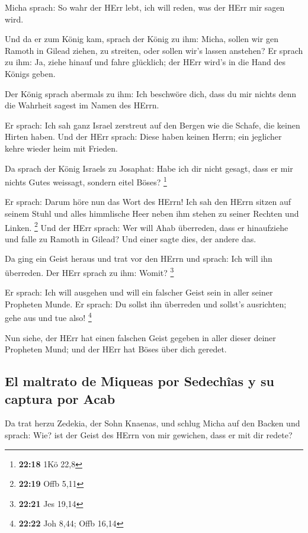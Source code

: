  Micha sprach: So wahr der HErr lebt, ich will reden, was
der HErr mir sagen wird.

 Und da er zum König kam, sprach der König zu ihm: Micha,
sollen wir gen Ramoth in Gilead ziehen, zu streiten, oder sollen wir's
lassen anstehen? Er sprach zu ihm: Ja, ziehe hinauf und fahre glücklich;
der HErr wird's in die Hand des Königs geben.

 Der König sprach abermals zu ihm: Ich beschwöre dich,
dass du mir nichts denn die Wahrheit sagest im Namen des HErrn.

 Er sprach: Ich sah ganz Israel zerstreut auf den Bergen
wie die Schafe, die keinen Hirten haben. Und der HErr sprach: Diese
haben keinen Herrn; ein jeglicher kehre wieder heim mit Frieden.

 Da sprach der König Israels zu Josaphat: Habe ich dir
nicht gesagt, dass er mir nichts Gutes weissagt, sondern eitel Böses?
\footnote{\textbf{22:18} 1Kö 22,8}

 Er sprach: Darum höre nun das Wort des HErrn! Ich sah
den HErrn sitzen auf seinem Stuhl und alles himmlische Heer neben ihm
stehen zu seiner Rechten und Linken. \footnote{\textbf{22:19} Offb 5,11}
 Und der HErr sprach: Wer will Ahab überreden, dass er
hinaufziehe und falle zu Ramoth in Gilead? Und einer sagte dies, der
andere das.

 Da ging ein Geist heraus und trat vor den HErrn und
sprach: Ich will ihn überreden. Der HErr sprach zu ihm: Womit?
\footnote{\textbf{22:21} Jes 19,14}

 Er sprach: Ich will ausgehen und will ein falscher Geist
sein in aller seiner Propheten Munde. Er sprach: Du sollst ihn überreden
und sollst's ausrichten; gehe aus und tue also! \footnote{\textbf{22:22}
  Joh 8,44; Offb 16,14}

 Nun siehe, der HErr hat einen falschen Geist gegeben in
aller dieser deiner Propheten Mund; und der HErr hat Böses über dich
geredet.

\hypertarget{el-maltrato-de-miqueas-por-sedechuxeeas-y-su-captura-por-acab}{%
\subsection{El maltrato de Miqueas por Sedechîas y su captura por
Acab}\label{el-maltrato-de-miqueas-por-sedechuxeeas-y-su-captura-por-acab}}

 Da trat herzu Zedekia, der Sohn Knaenas, und schlug
Micha auf den Backen und sprach: Wie? ist der Geist des HErrn von mir
gewichen, dass er mit dir redete?

